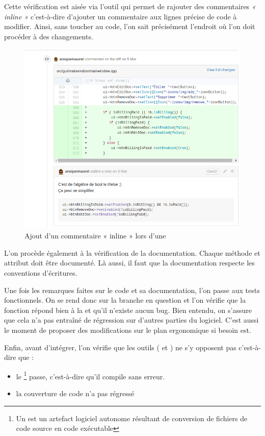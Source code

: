 Cette vérification est aisée via l'outil \Github{} qui permet de rajouter des commentaires \textit{« inline »} c'est-à-dire d'ajouter un commentaire aux lignes précise de code à modifier. Ainsi, sans toucher au code, l'on sait précisément l'endroit où l'on doit procéder à des changements. 
\begin{figure}[H]
	\centering
	\includegraphics[width=0.7\linewidth]{screens/comments_inline}
	\caption{Ajout d'un commentaire « inline » lors d'une \PullRequest}
	\label{fig:comments_inline}
\end{figure}

L'on procède également à la vérification de la documentation. Chaque méthode et attribut doit être documenté. Là aussi, il faut que la documentation respecte les conventions d'écritures. 

Une fois les remarques faites sur le code et sa documentation, l'on passe aux tests fonctionnels. On se rend donc sur la branche \Git{} en question et l'on vérifie que la fonction répond bien à la \UserStory{} et qu'il n'existe aucun bug. Bien entendu, on s'assure que cela n'a pas entraîné de régression sur d'autres parties du logiciel. C'est aussi le moment de proposer des modifications sur le plan ergonomique si besoin est.  

Enfin, avant d'intégrer, l'on vérifie que les outils (\Travis{} et \Coveralls) ne s'y opposent pas c'est-à-dire que :
\begin{itemize}
	\item le \Build{}\footnote{Un \Build est un artefact logiciel autonome résultant de conversion de fichiers de code source en code exécutable} passe, c'est-à-dire qu'il compile sans erreur.
	\item la couverture de code n'a pas régressé 
\end{itemize}
